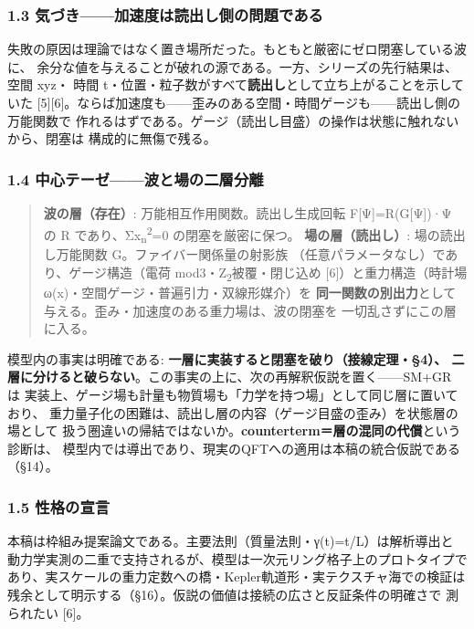 \documentclass[
]{ltjarticle}
\begin{document}
\subsubsection{1.3
気づき------加速度は読出し側の問題である}\label{ux6c17ux3065ux304dux52a0ux901fux5ea6ux306fux8aadux51faux3057ux5074ux306eux554fux984cux3067ux3042ux308b}

失敗の原因は理論ではなく置き場所だった。もともと厳密にゼロ閉塞している波に、
余分な値を与えることが破れの源である。一方、シリーズの先行結果は、空間
xyz・ 時間
t・位置・粒子数がすべて\textbf{読出し}として立ち上がることを示していた
{[}5{]}{[}6{]}。ならば加速度も------歪みのある空間・時間ゲージも------読出し側の万能関数で
作れるはずである。ゲージ（読出し目盛）の操作は状態に触れないから、閉塞は
構成的に無傷で残る。

\subsubsection{1.4
中心テーゼ------波と場の二層分離}\label{ux4e2dux5fc3ux30c6ux30fcux30bcux6ce2ux3068ux5834ux306eux4e8cux5c64ux5206ux96e2}

\begin{quote}
\textbf{波の層（存在）}: 万能相互作用関数。読出し生成回転
F{[}Ψ{]}=R(G{[}Ψ{]})·Ψ の R
であり、Σx\textsubscript{n}\textsuperscript{2}=0 の閉塞を厳密に保つ。
\textbf{場の層（読出し）}: 場の読出し万能関数
G。ファイバー関係量の射影族
（任意パラメータなし）であり、ゲージ構造（電荷
mod3・Z\textsubscript{2}被覆・閉じ込め {[}6{]}）と重力構造（時計場
ω(x)・空間ゲージ・普遍引力・双線形媒介）を
\textbf{同一関数の別出力}として与える。歪み・加速度のある重力場は、波の閉塞を
一切乱さずにこの層に入る。
\end{quote}

模型内の事実は明確である:
\textbf{一層に実装すると閉塞を破り（接線定理・§4）、
二層に分けると破らない}。この事実の上に、次の再解釈仮説を置く------SM+GR
は
実装上、ゲージ場も計量も物質場も「力学を持つ場」として同じ層に置いており、
重力量子化の困難は、読出し層の内容（ゲージ目盛の歪み）を状態層の場として
扱う圏違いの帰結ではないか。\textbf{counterterm＝層の混同の代償}という診断は、
模型内では導出であり、現実のQFTへの適用は本稿の統合仮説である（§14）。

\subsubsection{1.5 性格の宣言}\label{ux6027ux683cux306eux5ba3ux8a00}

本稿は枠組み提案論文である。主要法則（質量法則・γ(t)=t/L）は解析導出と
動力学実測の二重で支持されるが、模型は一次元リング格子上のプロトタイプで
あり、実スケールの重力定数への橋・Kepler軌道形・実テクスチャ海での検証は
残余として明示する（§16）。仮説の価値は接続の広さと反証条件の明確さで
測られたい {[}6{]}。
\end{document}
